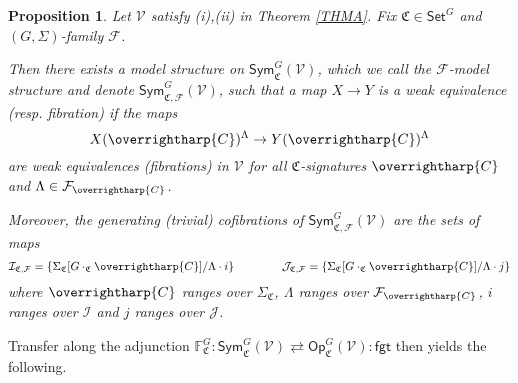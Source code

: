 \documentclass[a4paper,10pt
 ,final
]{article}%
\numberwithin{equation}{section}
\numberwithin{figure}{section}
\newtheorem{proposition}[equation]{Proposition}%
\theoremstyle{definition} %
\newcommand{\vect}[1]{\text{\overrightharp{\ensuremath{#1}}}}
\newcommand{\Sym}{\ensuremath{\mathsf{Sym}}}%
\newcommand{\F}{\ensuremath{\mathcal F}}
\newcommand{\V}{\ensuremath{\mathcal V}}
\newcommand{\1}{\ensuremath{\mathbbm 1}}%
\begin{document}
\begin{proposition}\label{SYMGFV PROP}
	Let $\V$ satisfy
	(i),(ii) in Theorem \ref{THMA}.
	Fix $\mathfrak{C} \in \mathsf{Set}^G$
	and $(G,\Sigma)$-family $\F$.
	
	Then there exists a model structure on
	$\mathsf{Sym}^G_{\mathfrak{C}}(\mathsf{\V})$,
	which we call the \emph{$\mathcal{F}$-model structure}
	and denote $\mathsf{Sym}^G_{\mathfrak{C},\F}(\V)$,
	such that a map $X \to Y$
	is a weak equivalence (resp. fibration) if the maps
\begin{equation}
	X(\vect{C})^{\Lambda} \to Y(\vect{C})^{\Lambda}
\end{equation}
	are weak equivalences (fibrations) in $\V$
	for all $\mathfrak{C}$-signatures $\vect{C}$
	and $\Lambda \in \F_{\vect{C}}$.	
	
	Moreover, the generating (trivial) cofibrations of
	$\Sym^{G}_{\mathfrak{C},\F}(\V)$
	are the sets of maps
	\begin{equation}\label{VGSIGF EQ}
	\mathcal{I}_{\mathfrak{C},\mathcal{F}}
	=
	\left\{
	\Sigma_{\mathfrak{C}}[G \cdot_{\mathfrak{C}} \vect{C}]/\Lambda \cdot i
	\right\}
	\qquad \qquad
	\mathcal{J}_{\mathfrak{C},\mathcal{F}}
	=
	\left\{
	\Sigma_{\mathfrak{C}}[G \cdot_{\mathfrak{C}} \vect{C}]/\Lambda \cdot j
	\right\}
	\end{equation}
	where $\vect{C}$ ranges over $\Sigma_{\mathfrak{C}}$,
	$\Lambda$ ranges over $\F_{\vect{C}}$,
	$i$ ranges over $\mathcal{I}$ and
	$j$ ranges over $\mathcal{J}$.
\end{proposition}



Transfer along the adjunction
$
\mathbb{F}^G_{\mathfrak{C}} \colon
\mathsf{Sym}^G_{\mathfrak{C}}(\V)
\rightleftarrows
\mathsf{Op}^G_{\mathfrak{C}}(\V)
\colon \mathsf{fgt}
$
then yields the following.
\end{document}
